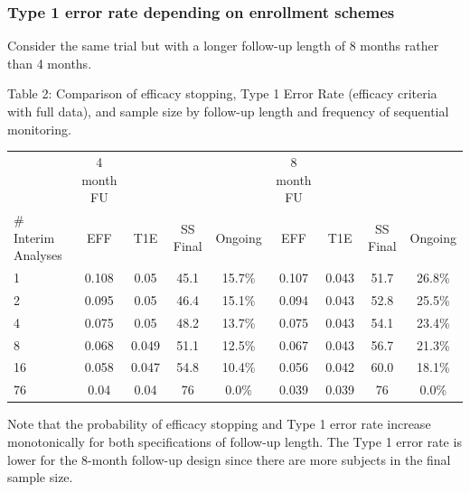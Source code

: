 \documentclass[12pt]{article}
\begin{document}
\newpage
\subsubsection{Type 1 error rate depending on enrollment schemes}
Consider the same trial but with a longer follow-up length of 8 months rather than 4 months. 
\begin{center}
Table 2: Comparison of efficacy stopping, Type 1 Error Rate (efficacy criteria with full data), and sample size by follow-up length and frequency of sequential monitoring.
\begin{tabular}{l | cccc|cccc}
	&	4 month FU	&		&		&		&	8 month FU	&		&		&		\\
															
\# Interim Analyses	&	EFF	&	T1E	&	SS Final	&	Ongoing	&	EFF	&	T1E	&	SS Final	&	Ongoing	\\
\hline		
1	&	0.108	&	0.05	&	45.1	&	15.7\%	&	0.107	&	0.043	&	51.7	&	26.8\%	\\
2	&	0.095	&	0.05	&	46.4	&	15.1\%	&	0.094	&	0.043	&	52.8	&	25.5\%	\\
4	&	0.075	&	0.05	&	48.2	&	13.7\%	&	0.075	&	0.043	&	54.1	&	23.4\%	\\
8	&	0.068	&	0.049	&	51.1	&	12.5\%	&	0.067	&	0.043	&	56.7	&	21.3\%	\\
16	&	0.058	&	0.047	&	54.8	&	10.4\%	&	0.056	&	0.042	&	60.0	&	18.1\%	\\
76	&	0.04	&	0.04	&	76	&	0.0\%	&	0.039	&	0.039	&	76	&	0.0\%	
\end{tabular}
\end{center}
Note that the probability of efficacy stopping and Type 1 error rate increase monotonically for both specifications of follow-up length. The Type 1 error rate is lower for the 8-month follow-up design since there are more subjects in the final sample size.

\end{document}
